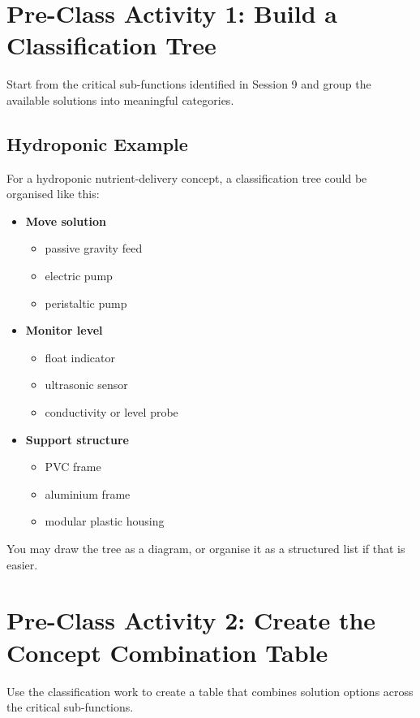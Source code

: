 \section{Pre-Class Activity 1: Build a Classification Tree}

Start from the critical sub-functions identified in Session 9 and group the available solutions into meaningful categories.

\subsection{Hydroponic Example}

For a hydroponic nutrient-delivery concept, a classification tree could be organised like this:
\begin{itemize}
    \item \textbf{Move solution}
    \begin{itemize}
        \item passive gravity feed
        \item electric pump
        \item peristaltic pump
    \end{itemize}
    \item \textbf{Monitor level}
    \begin{itemize}
        \item float indicator
        \item ultrasonic sensor
        \item conductivity or level probe
    \end{itemize}
    \item \textbf{Support structure}
    \begin{itemize}
        \item PVC frame
        \item aluminium frame
        \item modular plastic housing
    \end{itemize}
\end{itemize}

You may draw the tree as a diagram, or organise it as a structured list if that is easier.

\section{Pre-Class Activity 2: Create the Concept Combination Table}

Use the classification work to create a table that combines solution options across the critical sub-functions.

